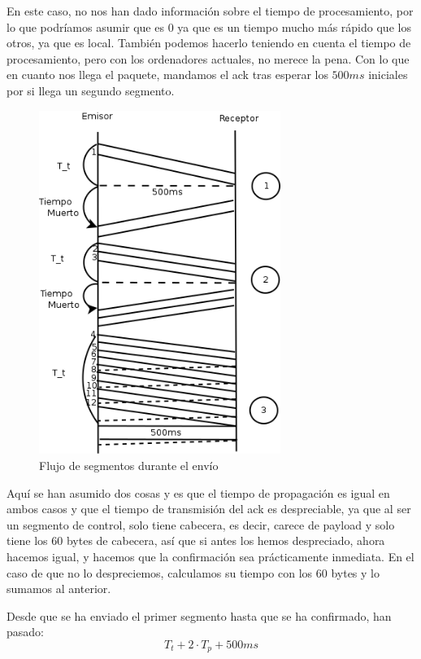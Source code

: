 \documentclass[10pt,a4paper,spanish]{report}
\begin{document}
En este caso, no nos han dado información sobre el tiempo de procesamiento, por lo que podríamos asumir que es 0 ya que es un tiempo mucho más rápido que los otros, ya que es local. También podemos hacerlo teniendo en cuenta el tiempo de procesamiento, pero con los ordenadores actuales, no merece la pena. Con lo que en cuanto nos llega el paquete, mandamos el ack tras esperar los $500ms$ iniciales por si llega un segundo segmento. 

\begin{figure}
  \centering
  \includegraphics[width=0.7\textwidth]{ej15}
  \caption{Flujo de segmentos durante el envío}
  \label{ej15}
\end{figure}

Aquí se han asumido dos cosas y es que el tiempo de propagación es igual en ambos casos y que el tiempo de transmisión del ack es despreciable, ya que al ser un segmento de control, solo tiene cabecera, es decir, carece de payload y solo tiene los 60 bytes de cabecera, así que si antes los hemos despreciado, ahora hacemos igual, y hacemos que la confirmación sea prácticamente inmediata. En el caso de que no lo despreciemos, calculamos su tiempo con los 60 bytes y lo sumamos al anterior.

Desde que se ha enviado el primer segmento hasta que se ha confirmado, han pasado:
\begin{displaymath}
    T_t + 2\cdot T_p + 500 ms
\end{displaymath}
\end{document}
